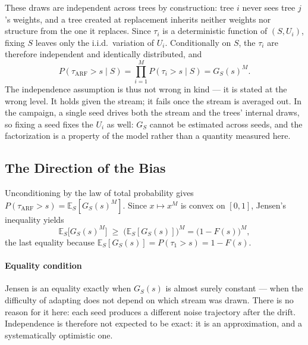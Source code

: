 \documentclass[10pt,conference]{IEEEtran}
\theoremstyle{definition}
\begin{document}
These draws are independent across trees by construction: tree $i$ never sees tree $j$'s
weights, and a tree created at replacement inherits neither weights nor structure from the
one it replaces. Since $\tau_i$ is a deterministic function of $(S, U_i)$, fixing $S$
leaves only the i.i.d.\ variation of $U_i$. Conditionally on $S$, the $\tau_i$ are
therefore independent and identically distributed, and
\[
  P(\tau_{\mathrm{ARF}}>s \mid S) = \prod_{i=1}^{M} P(\tau_i>s\mid S) = G_S(s)^M .
\]
The independence assumption is thus not wrong in kind --- it is stated at the wrong level.
It holds given the stream; it fails once the stream is averaged out. In the campaign, a
single seed drives both the stream and the trees' internal draws, so fixing a seed fixes
the $U_i$ as well: $G_S$ cannot be estimated across seeds, and the factorization is a
property of the model rather than a quantity measured here.

\subsection{The Direction of the Bias}
\label{sec:convexity}

Unconditioning by the law of total probability gives
$P(\tau_{\mathrm{ARF}}>s) = \mathbb{E}_S[G_S(s)^M]$. Since $x \mapsto x^M$ is convex on
$[0,1]$, Jensen's inequality yields
\[
  \mathbb{E}_S\big[G_S(s)^M\big] \;\ge\; \big(\mathbb{E}_S[G_S(s)]\big)^M
  = \big(1-F(s)\big)^M ,
\]
the last equality because $\mathbb{E}_S[G_S(s)] = P(\tau_1>s) = 1-F(s)$.

\begin{center}
\end{center}

\paragraph{Equality condition} Jensen is an equality exactly when $G_S(s)$ is almost
surely constant --- when the difficulty of adapting does not depend on which stream was
drawn. There is no reason for it here: each seed produces a different noise trajectory after the
drift. Independence is therefore not expected to be exact: it is an approximation, and a
systematically optimistic one.
\end{document}
